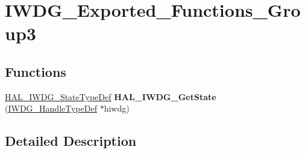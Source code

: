 \hypertarget{group___i_w_d_g___exported___functions___group3}{\section{I\-W\-D\-G\-\_\-\-Exported\-\_\-\-Functions\-\_\-\-Group3}
\label{group___i_w_d_g___exported___functions___group3}
}
\subsection*{Functions}
\begin{DoxyCompactItemize}
\item 
\hypertarget{group___i_w_d_g___exported___functions___group3_ga4b2f32b043612fdd1b68f806115d8de4}{\hyperlink{group___i_w_d_g___exported___types_ga61699dc6f24a3edecddd16018560d0e5}{H\-A\-L\-\_\-\-I\-W\-D\-G\-\_\-\-State\-Type\-Def} {\bfseries H\-A\-L\-\_\-\-I\-W\-D\-G\-\_\-\-Get\-State} (\hyperlink{struct_i_w_d_g___handle_type_def}{I\-W\-D\-G\-\_\-\-Handle\-Type\-Def} $\ast$hiwdg)}\label{group___i_w_d_g___exported___functions___group3_ga4b2f32b043612fdd1b68f806115d8de4}

\end{DoxyCompactItemize}


\subsection{Detailed Description}
